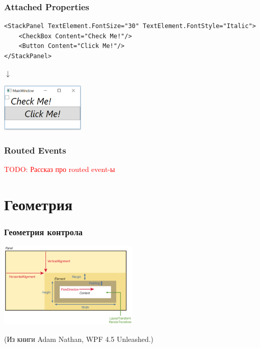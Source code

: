 \documentclass[xetex,mathserif,serif]{beamer}
\newcommand{\todo}[1] {
	\begin{center}\textcolor{red}{TODO: #1}\end{center}
}
\begin{document}
	\begin{frame}[fragile]
		\frametitle{Attached Properties}
		\begin{small}
			\begin{verbatim}
<StackPanel TextElement.FontSize="30" TextElement.FontStyle="Italic">
    <CheckBox Content="Check Me!"/>
    <Button Content="Click Me!"/>
</StackPanel>
			\end{verbatim}
		\end{small}
		\begin{center}\begin{LARGE}$\downarrow$\end{LARGE}\end{center}
		\begin{center}
			\includegraphics[width=0.3\textwidth]{fancyWindow.png}
		\end{center}
	\end{frame}

	\begin{frame}
		\frametitle{Routed Events}
		\todo{Рассказ про routed event-ы}
	\end{frame}

	\section{Геометрия}

	\begin{frame}
		\frametitle{Геометрия контрола}
		\begin{center}
			\includegraphics[width=0.5\textwidth]{controlGeometry.png}
		\end{center}
		\begin{center}{\footnotesize(Из книги Adam Nathan, WPF 4.5 Unleashed.)}\end{center}
	\end{frame}
\end{document}
